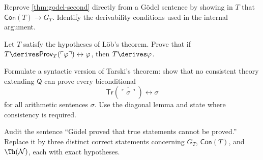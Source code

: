 \begin{exercise}
\label{ex:second-incompleteness-01}
Reprove \cref{thm:godel-second} directly from a G\"odel sentence by showing in
\(T\) that \(\mathsf{Con}(T)\to G_T\).  Identify the derivability conditions
used in the internal argument.
\end{exercise}

\begin{exercise}
\label{ex:second-incompleteness-02}
Let \(T\) satisfy the hypotheses of L\"ob's theorem.  Prove that if
\(T\derives\mathsf{Prov}_T(\ulcorner\varphi\urcorner)
\leftrightarrow\varphi\), then \(T\derives\varphi\).
\end{exercise}

\begin{exercise}
\label{ex:second-incompleteness-03}
Formulate a syntactic version of Tarski's theorem: show that no consistent
theory extending \(\mathsf Q\) can prove every biconditional
\[
  \mathsf{Tr}(\overline{\ulcorner\sigma\urcorner})
  \leftrightarrow\sigma
\]
for all arithmetic sentences \(\sigma\).  Use the diagonal lemma and state
where consistency is required.
\end{exercise}

\begin{exercise}
\label{ex:second-incompleteness-04}
Audit the sentence ``G\"odel proved that true statements cannot be proved.''
Replace it by three distinct correct statements concerning \(G_T\),
\(\mathsf{Con}(T)\), and \(\Th(\mathcal N)\), each with exact hypotheses.
\end{exercise}
